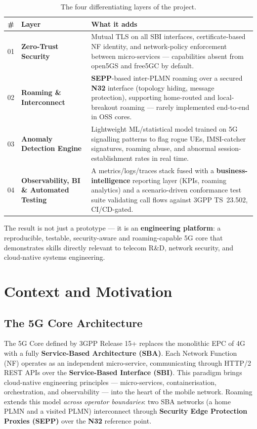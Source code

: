 \documentclass[11pt,a4paper]{report}
\begin{document}
\begin{table}[h]
\centering
\renewcommand{\arraystretch}{1.35}
\begin{tabularx}{\linewidth}{@{}c l X@{}}
\toprule
\textbf{\#} & \textbf{Layer} & \textbf{What it adds}\\
\midrule
01 & \textbf{Zero-Trust Security} &
  Mutual TLS on all SBI interfaces, certificate-based NF identity, and network-policy
  enforcement between micro-services --- capabilities absent from open5GS and free5GC by
  default.\\
02 & \textbf{Roaming \& Interconnect} &
  \textbf{SEPP}-based inter-PLMN roaming over a secured \textbf{N32} interface (topology
  hiding, message protection), supporting home-routed and local-breakout roaming ---
  rarely implemented end-to-end in OSS cores.\\
03 & \textbf{Anomaly Detection Engine} &
  Lightweight ML/statistical model trained on 5G signalling patterns to flag rogue UEs,
  IMSI-catcher signatures, roaming abuse, and abnormal session-establishment rates in
  real time.\\
04 & \textbf{Observability, BI \& Automated Testing} &
  A metrics/logs/traces stack fused with a \textbf{business-intelligence} reporting layer
  (KPIs, roaming analytics) and a scenario-driven conformance test suite validating call
  flows against 3GPP TS~23.502, CI/CD-gated.\\
\bottomrule
\end{tabularx}
\caption{The four differentiating layers of the project.}
\label{tab:layers}
\end{table}

The result is not just a prototype --- it is an \textbf{engineering platform}: a
reproducible, testable, security-aware and roaming-capable 5G core that demonstrates
skills directly relevant to telecom R\&D, network security, and cloud-native systems
engineering.

\section{Context and Motivation}

\subsection{The 5G Core Architecture}
The 5G Core defined by 3GPP Release 15+ replaces the monolithic EPC of 4G with a fully
\textbf{Service-Based Architecture (SBA)}. Each Network Function (NF) operates as an
independent micro-service, communicating through HTTP/2 REST APIs over the
\textbf{Service-Based Interface (SBI)}. This paradigm brings cloud-native engineering
principles --- micro-services, containerisation, orchestration, and observability ---
into the heart of the mobile network. Roaming extends this model \emph{across operator
boundaries}: two SBA networks (a home PLMN and a visited PLMN) interconnect through
\textbf{Security Edge Protection Proxies (SEPP)} over the \textbf{N32} reference point.
\end{document}
